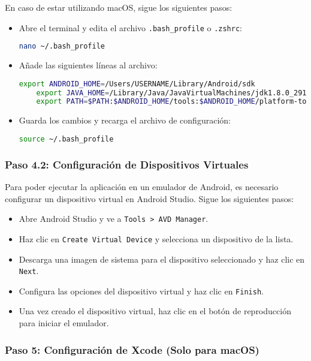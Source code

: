 En caso de estar utilizando macOS, sigue los siguientes pasos:
\begin {itemize}
\item Abre el terminal y edita el archivo \texttt{.bash\_profile} o \texttt{.zshrc}:
\begin{lstlisting}[language=bash]
    nano ~/.bash_profile
    \end{lstlisting}
\item Añade las siguientes líneas al archivo:
\begin{lstlisting}[language=bash]
    export ANDROID_HOME=/Users/USERNAME/Library/Android/sdk
    export JAVA_HOME=/Library/Java/JavaVirtualMachines/jdk1.8.0_291.jdk/Contents/Home
    export PATH=$PATH:$ANDROID_HOME/tools:$ANDROID_HOME/platform-tools
    \end{lstlisting}
\item Guarda los cambios y recarga el archivo de configuración:
\begin{lstlisting}[language=bash]
    source ~/.bash_profile
    \end{lstlisting}
\end {itemize}

\subsubsection{Paso 4.2: Configuración de Dispositivos Virtuales}
Para poder ejecutar la aplicación en un emulador de Android, es necesario configurar un dispositivo virtual en Android Studio. Sigue los siguientes pasos:
\begin {itemize}
\item Abre Android Studio y ve a \texttt{Tools > AVD Manager}.
\item Haz clic en \texttt{Create Virtual Device} y selecciona un dispositivo de la lista.
\item Descarga una imagen de sistema para el dispositivo seleccionado y haz clic en \texttt{Next}.
\item Configura las opciones del dispositivo virtual y haz clic en \texttt{Finish}.
\item Una vez creado el dispositivo virtual, haz clic en el botón de reproducción para iniciar el emulador.
\end {itemize}


\subsubsection{Paso 5: Configuración de Xcode (Solo para macOS)}

